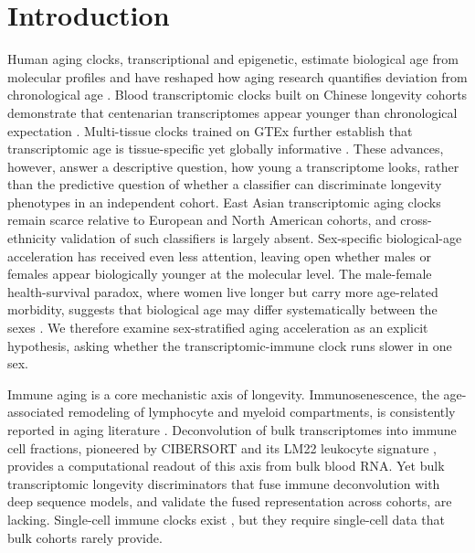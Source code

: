 \documentclass[11pt,a4paper]{article}
\begin{document}
\section{Introduction}\label{sec:intro}
Human aging clocks, transcriptional and epigenetic, estimate biological age from molecular profiles and have reshaped how aging research quantifies deviation from chronological age \cite{horvath2013dna,hannum2013genome,levine2018epigenetic,lu2019dna,jylhava2017biological,klemera2006new,belsky2020quantification,levine_2019,lu_2019,zhang_2019,lowe_2016,liu_2024,zhou_2023,jothi_2025,ebiomedicine_2026,chen_2026,grolaux_2026,zhang_2026,zhou_2026,gurinovich_2019,partridge2018new}. Blood transcriptomic clocks built on Chinese longevity cohorts demonstrate that centenarian transcriptomes appear younger than chronological expectation \cite{peters2015transcriptional,marioni2015transcriptomic,xiao2019aging}. Multi-tissue clocks trained on GTEx further establish that transcriptomic age is tissue-specific yet globally informative \cite{orange2026brief,mamoshina2018machine,holzscheck2021modeling,ferrari2022multi,kogan2017transcriptomic,shokhirev2019modeling,gtex2015consortium,gtex2020consortium}. These advances, however, answer a descriptive question, how young a transcriptome looks, rather than the predictive question of whether a classifier can discriminate longevity phenotypes in an independent cohort. East Asian transcriptomic aging clocks remain scarce relative to European and North American cohorts, and cross-ethnicity validation of such classifiers is largely absent. Sex-specific biological-age acceleration has received even less attention, leaving open whether males or females appear biologically younger at the molecular level. The male-female health-survival paradox, where women live longer but carry more age-related morbidity, suggests that biological age may differ systematically between the sexes \cite{austad_2006,hagg_2021}. We therefore examine sex-stratified aging acceleration as an explicit hypothesis, asking whether the transcriptomic-immune clock runs slower in one sex.

Immune aging is a core mechanistic axis of longevity. Immunosenescence, the age-associated remodeling of lymphocyte and myeloid compartments, is consistently reported in aging literature \cite{franceschi2018inflammaging,goronzy2017fifty,fulop2018immunosenescence,nikolich2008ageing,pawelec2018conundrum,weng2006aging,shaw2010aging,solana2012innate,lopez2013hallmarks,lopez2023hallmarks,fulop_2012,flemming_2021,filippov_2024,larsen_2024,slipchenko_2023}. Deconvolution of bulk transcriptomes into immune cell fractions, pioneered by CIBERSORT and its LM22 leukocyte signature \cite{newman2015robust,newman2019determining,aran2015systematic,wang2022deconvolution,zhou2024immune,zhang2022aging}, provides a computational readout of this axis from bulk blood RNA. Yet bulk transcriptomic longevity discriminators that fuse immune deconvolution with deep sequence models, and validate the fused representation across cohorts, are lacking. Single-cell immune clocks exist \cite{scimmuaging2025,hashimoto2019single,kamada2020single}, but they require single-cell data that bulk cohorts rarely provide.
\end{document}
